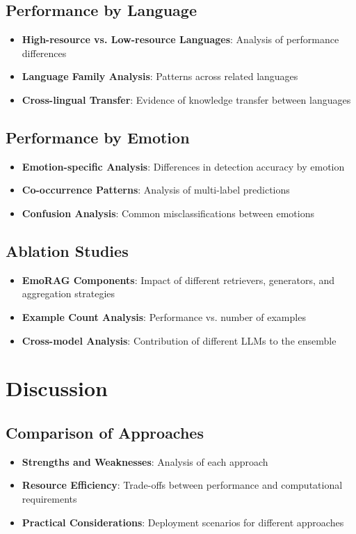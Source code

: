 \documentclass[a4paper,12pt]{extarticle}
\begin{document}
\subsection{Performance by Language}
\begin{itemize}
\item \textbf{High-resource vs. Low-resource Languages}: Analysis of performance differences
\item \textbf{Language Family Analysis}: Patterns across related languages
\item \textbf{Cross-lingual Transfer}: Evidence of knowledge transfer between languages
\end{itemize}

\subsection{Performance by Emotion}
\begin{itemize}
\item \textbf{Emotion-specific Analysis}: Differences in detection accuracy by emotion
\item \textbf{Co-occurrence Patterns}: Analysis of multi-label predictions
\item \textbf{Confusion Analysis}: Common misclassifications between emotions
\end{itemize}

\subsection{Ablation Studies}
\begin{itemize}
\item \textbf{EmoRAG Components}: Impact of different retrievers, generators, and aggregation strategies
\item \textbf{Example Count Analysis}: Performance vs. number of examples
\item \textbf{Cross-model Analysis}: Contribution of different LLMs to the ensemble
\end{itemize}

\section{Discussion}

\subsection{Comparison of Approaches}
\begin{itemize}
\item \textbf{Strengths and Weaknesses}: Analysis of each approach
\item \textbf{Resource Efficiency}: Trade-offs between performance and computational requirements
\item \textbf{Practical Considerations}: Deployment scenarios for different approaches
\end{itemize}
\end{document}
